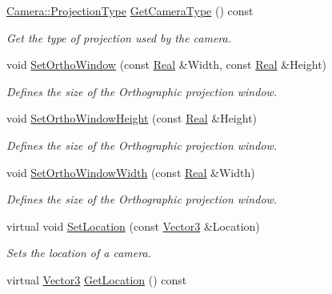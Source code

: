 \begin{DoxyCompactItemize}
\hyperlink{classphys_1_1Camera_a87d8d46e9eb2080b10712079be69d86a}{Camera::ProjectionType} \hyperlink{classphys_1_1Camera_aa79582e78a3eff11a8c4fe9c058566b0}{GetCameraType} () const 
\begin{DoxyCompactList}\small\item\em Get the type of projection used by the camera. \item\end{DoxyCompactList}\item 
void \hyperlink{classphys_1_1Camera_a24cb50ccb644f3f7e925819aba3ddad2}{SetOrthoWindow} (const \hyperlink{namespacephys_af7eb897198d265b8e868f45240230d5f}{Real} \&Width, const \hyperlink{namespacephys_af7eb897198d265b8e868f45240230d5f}{Real} \&Height)
\begin{DoxyCompactList}\small\item\em Defines the size of the Orthographic projection window. \item\end{DoxyCompactList}\item 
void \hyperlink{classphys_1_1Camera_a76c140a73a4d862f260b4a76d85b4e34}{SetOrthoWindowHeight} (const \hyperlink{namespacephys_af7eb897198d265b8e868f45240230d5f}{Real} \&Height)
\begin{DoxyCompactList}\small\item\em Defines the size of the Orthographic projection window. \item\end{DoxyCompactList}\item 
void \hyperlink{classphys_1_1Camera_a1e5ba572ce27880def46538157f4ccb7}{SetOrthoWindowWidth} (const \hyperlink{namespacephys_af7eb897198d265b8e868f45240230d5f}{Real} \&Width)
\begin{DoxyCompactList}\small\item\em Defines the size of the Orthographic projection window. \item\end{DoxyCompactList}\item 
virtual void \hyperlink{classphys_1_1Camera_afd2a77e96dd6d0dec1071dcc3229425f}{SetLocation} (const \hyperlink{classphys_1_1Vector3}{Vector3} \&Location)
\begin{DoxyCompactList}\small\item\em Sets the location of a camera. \item\end{DoxyCompactList}\item 
virtual \hyperlink{classphys_1_1Vector3}{Vector3} \hyperlink{classphys_1_1Camera_a75b3f25ff664c4f95f0e04cb9edceeb4}{GetLocation} () const 

\end{DoxyCompactItemize}
